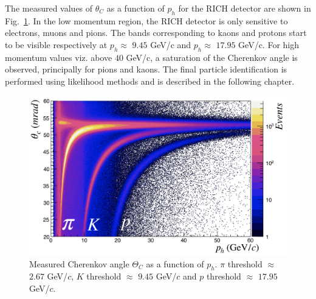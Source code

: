 The measured values of $\theta_C$ as a function of $p_h$ for the RICH detector are shown in Fig.~\ref{pic:RICH}. In the low momentum region, the RICH detector is only sensitive to electrons, muons and pions. The bands corresponding to kaons and protons start to be visible respectively at $p_h \approx$ $9.45$ GeV/c and $p_h \approx$ $17.95$ GeV/c. For high momentum values viz. above $40$ GeV/c, a saturation of the Cherenkov angle is observed, principally for pions and kaons. The final particle identification is performed using likelihood methods and is described in the following chapter.

\begin{figure}[!h]
  \centering
	\includegraphics[scale=0.45]{./gfx/RICH.png}
	\caption{Measured Cherenkov angle $\Theta_C$ as a function of $p_h$. $\pi$ threshold $\approx$ $2.67$ GeV/$c$, $K$ threshold $\approx$ $9.45$ GeV/$c$ and $p$ threshold $\approx$ $17.95$ GeV/$c$.}
	\label{pic:RICH}
\end{figure}
